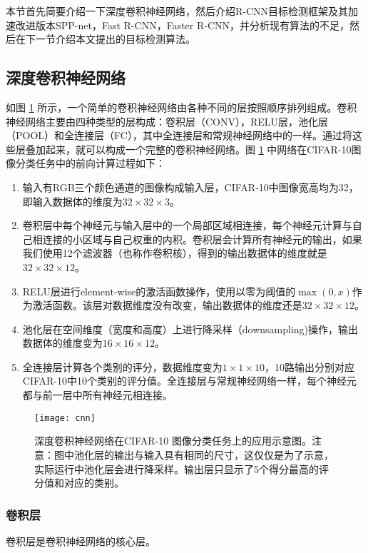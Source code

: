 本节首先简要介绍一下深度卷积神经网络，然后介绍R-CNN目标检测框架及其加速改进版本SPP-net，Fast R-CNN，Faster R-CNN，并分析现有算法的不足，然后在下一节介绍本文提出的目标检测算法。

\subsection{深度卷积神经网络}
如图 \ref{cnn} 所示，一个简单的卷积神经网络由各种不同的层按照顺序排列组成。卷积神经网络主要由四种类型的层构成：卷积层（CONV），RELU层，池化层（POOL）和全连接层（FC），其中全连接层和常规神经网络中的一样。通过将这些层叠加起来，就可以构成一个完整的卷积神经网络。图 \ref{cnn} 中网络在CIFAR-10图像分类任务中的前向计算过程如下：
\begin{enumerate}
	\item 输入有RGB三个颜色通道的图像构成输入层，CIFAR-10中图像宽高均为32，即输入数据体的维度为$32\times32\times3$。
	\item 卷积层中每个神经元与输入层中的一个局部区域相连接，每个神经元计算与自己相连接的小区域与自己权重的内积。卷积层会计算所有神经元的输出，如果我们使用12个滤波器（也称作卷积核），得到的输出数据体的维度就是$32\times32\times12$。
	\item RELU层进行element-wise的激活函数操作，使用以零为阈值的$\max(0,x)$作为激活函数。该层对数据维度没有改变，输出数据体的维度还是$32\times32\times12$。
	\item
	池化层在空间维度（宽度和高度）上进行降采样（downsampling)操作，输出数据体的维度变为$16\times16\times12$。
	\item
	全连接层计算各个类别的评分，数据维度变为$1\times1\times10$，10路输出分别对应CIFAR-10中10个类别的评分值。全连接层与常规神经网络一样，每个神经元都与前一层中所有神经元相连接。
\end{enumerate}
\begin{figure}[!t]
	\centering
	\texttt{[image: cnn]}
	\caption{深度卷积神经网络在CIFAR-10 \cite{cifar-10} 图像分类任务上的应用示意图。注意：图中池化层的输出与输入具有相同的尺寸，这仅仅是为了示意，实际运行中池化层会进行降采样。输出层只显示了5个得分最高的评分值和对应的类别。}
	\label{cnn}
\end{figure}

\subsubsection{卷积层}
卷积层是卷积神经网络的核心层。